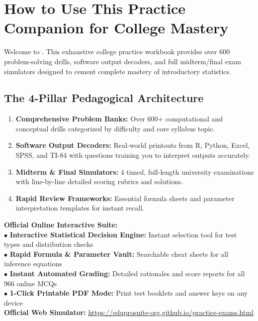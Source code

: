 \tableofcontents
\clearpage

\chapter*{How to Use This Practice Companion for College Mastery}

Welcome to \textbf{\BookTitle}. This exhaustive college practice workbook provides over 600 problem-solving drills, software output decoders, and full midterm/final exam simulators designed to cement complete mastery of introductory statistics.

\section*{The 4-Pillar Pedagogical Architecture}
\begin{enumerate}[leftmargin=1.5em]
  \item \textbf{Comprehensive Problem Banks:} Over 600+ computational and conceptual drills categorized by difficulty and core syllabus topic.
  \item \textbf{Software Output Decoders:} Real-world printouts from R, Python, Excel, SPSS, and TI-84 with questions training you to interpret outputs accurately.
  \item \textbf{Midterm \& Final Simulators:} 4 timed, full-length university examinations with line-by-line detailed scoring rubrics and solutions.
  \item \textbf{Rapid Review Frameworks:} Essential formula sheets and parameter interpretation templates for instant recall.
\end{enumerate}

\begin{center}
\begin{tcolorbox}[standard jigsaw,width=0.95\linewidth,colback=NavyBlue!5!white,colframe=NavyBlue,title=\textbf{FREE DIGITAL WEB COMPANION \& PRACTICE PORTAL}]
\begin{minipage}{0.95\linewidth}
  \textbf{Official Online Interactive Suite:}\\
  $\bullet$ \textbf{Interactive Statistical Decision Engine:} Instant selection tool for test types and distribution checks\\
  $\bullet$ \textbf{Rapid Formula \& Parameter Vault:} Searchable cheat sheets for all inference equations\\
  $\bullet$ \textbf{Instant Automated Grading:} Detailed rationales and score reports for all 966 online MCQs\\
  $\bullet$ \textbf{1-Click Printable PDF Mode:} Print test booklets and answer keys on any device\\[6pt]
  \textbf{Official Web Simulator:} \url{https://eduprosuite-org.github.io/practice-exams.html}
\end{minipage}
\end{tcolorbox}
\end{center}

